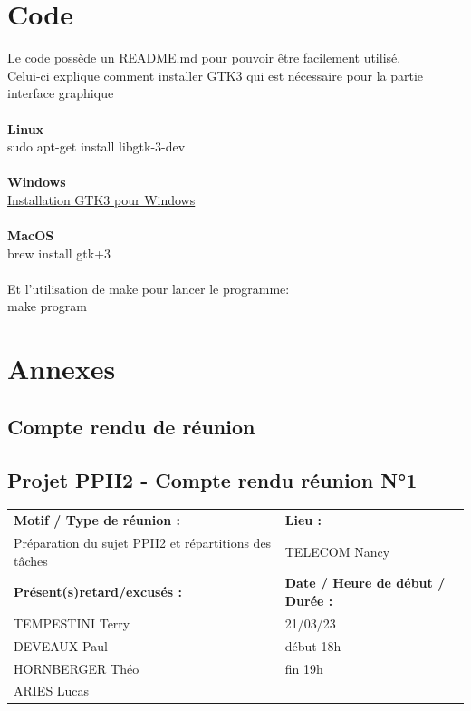 \documentclass[12pt,titlepage]{report}
\begin{document}
\newpage
\chapter{Code}

Le code possède un README.md pour pouvoir être facilement utilisé. \\
Celui-ci explique comment installer GTK3 qui est nécessaire pour la partie interface graphique  
\\
\\
\textbf{Linux} \\
sudo apt-get install libgtk-3-dev \\ 
\\
\textbf{Windows} \\
\href{https://www.gtk.org/docs/installations/windows/}{Installation GTK3 pour Windows} \\ 
\\
\textbf{MacOS} \\
brew install gtk+3 \\ \\
Et l'utilisation de make pour lancer le programme: \\
make program \\

\chapter{Annexes}

\section{Compte rendu de réunion}

\section*{Projet PPII2 - Compte rendu réunion N°1}
\begin{tabular}{|p{7cm}|p{6cm}|}
    \hline
    \textbf{Motif / Type de réunion :}
    & \textbf{Lieu :}
    \\
    Préparation du sujet PPII2 et répartitions des tâches 
    & 
    TELECOM Nancy
    \\ \hline
    \textbf{Présent(s)retard/excusés :}
    &
    \textbf{Date / Heure de début / Durée :}
    \\ 
    TEMPESTINI Terry &  21/03/23\\  
    DEVEAUX Paul & début 18h\\
    HORNBERGER Théo & fin 19h\\
    ARIES Lucas & 
    \\ \hline
\end{tabular}
\end{document}
